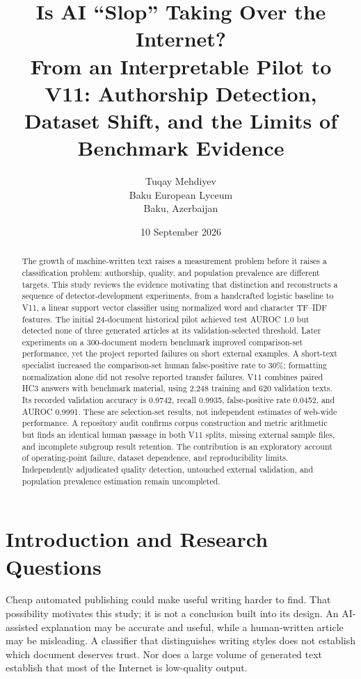 \documentclass[11pt]{article}
\title{Is AI ``Slop'' Taking Over the Internet?\\
\large From an Interpretable Pilot to V11: Authorship Detection,\\
Dataset Shift, and the Limits of Benchmark Evidence}
\author{Tuqay Mehdiyev\\
\small Baku European Lyceum\\
\small Baku, Azerbaijan}
\date{10 September 2026}
\begin{document}
\maketitle

\begin{abstract}
The growth of machine-written text raises a measurement problem before it
raises a classification problem: authorship, quality, and population prevalence
are different targets. This study reviews the evidence motivating that
distinction and reconstructs a sequence of detector-development experiments,
from a handcrafted logistic baseline to V11, a linear support vector classifier
using normalized word and character TF--IDF features. The initial 24-document
historical pilot achieved test AUROC 1.0 but detected none of three generated
articles at its validation-selected threshold. Later experiments on a
300-document modern benchmark improved comparison-set performance, yet the
project reported failures on short external examples. A short-text specialist
increased the comparison-set human false-positive rate to 30\%; formatting
normalization alone did not resolve reported transfer failures. V11 combines
paired HC3 answers with benchmark material, using 2,248 training and 620
validation texts. Its recorded validation accuracy is 0.9742, recall 0.9935,
false-positive rate 0.0452, and AUROC 0.9991. These are selection-set results,
not independent estimates of web-wide performance. A repository audit confirms
corpus construction and metric arithmetic but finds an identical human passage
in both V11 splits, missing external sample files, and incomplete subgroup
result retention. The contribution is an exploratory account of operating-point
failure, dataset dependence, and reproducibility limits. Independently
adjudicated quality detection, untouched external validation, and population
prevalence estimation remain uncompleted.
\end{abstract}

\section{Introduction and Research Questions}
Cheap automated publishing could make useful writing harder to find. That
possibility motivates this study; it is not a conclusion built into its design.
An AI-assisted explanation may be accurate and useful, while a human-written
article may be misleading. A classifier that distinguishes writing styles
does not establish which document deserves trust. Nor does a large volume of
generated text establish that most of the Internet is low-quality output.
\end{document}
